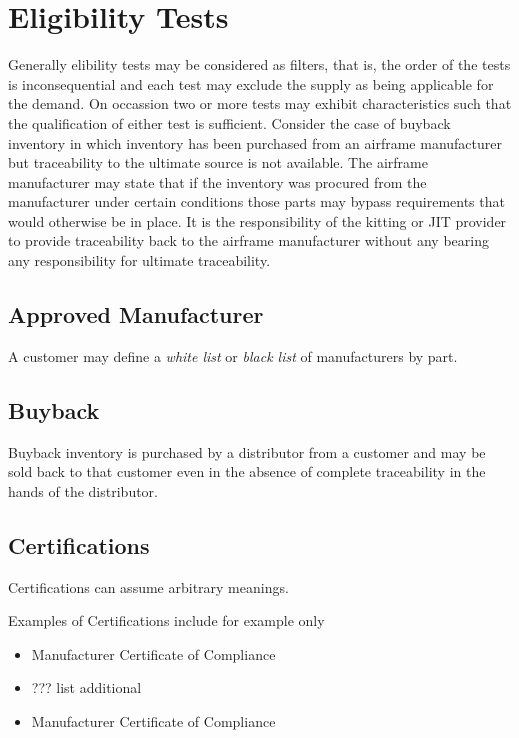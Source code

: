 \documentclass[letterpaper,10pt,english]{sphinxmanual}
\begin{document}
\chapter{Eligibility Tests}
\label{APS/EligibilityTests:eligibility-tests}\label{APS/EligibilityTests::doc}
Generally elibility tests may be considered as filters, that is, the
order of the tests is inconsequential and each test may exclude the
supply as being applicable for the demand. On occassion two or more
tests may exhibit characteristics such that the qualification of either
test is sufficient. Consider the case of buyback inventory in which
inventory has been purchased from an airframe manufacturer but
traceability to the ultimate source is not available. The airframe
manufacturer may state that if the inventory was procured from the
manufacturer under certain conditions those parts may bypass
requirements that would otherwise be in place. It is the responsibility
of the kitting or JIT provider to provide traceability back to the
airframe manufacturer without any bearing any responsibility for
ultimate traceability.


\section{Approved Manufacturer}
\label{APS/EligibilityTests:approved-manufacturer}
A customer may define a \emph{white list} or \emph{black list} of manufacturers by
part.


\section{Buyback}
\label{APS/EligibilityTests:buyback}
Buyback inventory is purchased by a distributor from a customer and may
be sold back to that customer even in the absence of complete
traceability in the hands of the distributor.


\section{Certifications}
\label{APS/EligibilityTests:certifications}
Certifications can assume arbitrary meanings.

Examples of Certifications include for example only
\begin{itemize}
\item {} 
Manufacturer Certificate of Compliance

\item {} 
??? list additional

\item {} 
Manufacturer Certificate of Compliance

\end{itemize}
\end{document}
